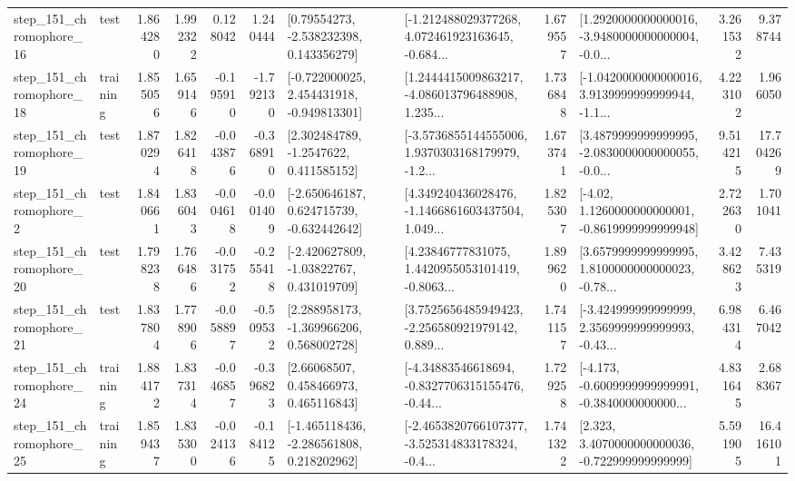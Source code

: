 \begin{tabular}{llrrrrllrlrr}
  step\_151\_chromophore\_16 &      test &      1.864280 &    1.992322 &      0.128042 &  1.240444 &     [0.79554273, -2.538232398, 0.143356279] &  [-1.212488029377268, 4.072461923163645, -0.684... &       1.679557 &  [1.2920000000000016, -3.9480000000000004, -0.0... &            3.261532 &          9.378744 \\
  step\_151\_chromophore\_18 &  training &      1.855056 &    1.659146 &     -0.195910 & -1.792130 &   [-0.722000025, 2.454431918, -0.949813301] &  [1.2444415009863217, -4.086013796488908, 1.235... &       1.736848 &  [-1.0420000000000016, 3.9139999999999944, -1.1... &            4.223102 &          1.966050 \\
  step\_151\_chromophore\_19 &      test &      1.870294 &    1.826418 &     -0.043876 & -0.368910 &      [2.302484789, -1.2547622, 0.411585152] &  [-3.5736855144555006, 1.9370303168179979, -1.2... &       1.673741 &  [3.4879999999999995, -2.0830000000000055, -0.0... &            9.514215 &         17.704269 \\
   step\_151\_chromophore\_2 &      test &      1.840661 &    1.836043 &     -0.004618 & -0.001409 &   [-2.650646187, 0.624715739, -0.632442642] &  [4.349240436028476, -1.1466861603437504, 1.049... &       1.825307 &   [-4.02, 1.1260000000000001, -0.8619999999999948] &            2.722630 &          1.701041 \\
  step\_151\_chromophore\_20 &      test &      1.798238 &    1.766486 &     -0.031752 & -0.255418 &    [-2.420627809, -1.03822767, 0.431019709] &  [4.23846777831075, 1.4420955053101419, -0.8063... &       1.899620 &  [3.6579999999999995, 1.8100000000000023, -0.78... &            3.428623 &          7.435319 \\
  step\_151\_chromophore\_21 &      test &      1.837804 &    1.778906 &     -0.058897 & -0.509532 &    [2.288958173, -1.369966206, 0.568002728] &  [3.7525656485949423, -2.256580921979142, 0.889... &       1.741157 &  [-3.424999999999999, 2.3569999999999993, -0.43... &            6.984314 &          6.467042 \\
  step\_151\_chromophore\_24 &  training &      1.884172 &    1.837314 &     -0.046857 & -0.396823 &      [2.66068507, 0.458466973, 0.465116843] &  [-4.34883546618694, -0.8327706315155476, -0.44... &       1.729258 &  [-4.173, -0.6009999999999991, -0.3840000000000... &            4.831645 &          2.688367 \\
  step\_151\_chromophore\_25 &  training &      1.859437 &    1.835300 &     -0.024136 & -0.184125 &   [-1.465118436, -2.286561808, 0.218202962] &  [-2.4653820766107377, -3.525314833178324, -0.4... &       1.741322 &    [2.323, 3.4070000000000036, -0.722999999999999] &            5.591905 &         16.416101 \\

\end{tabular}
